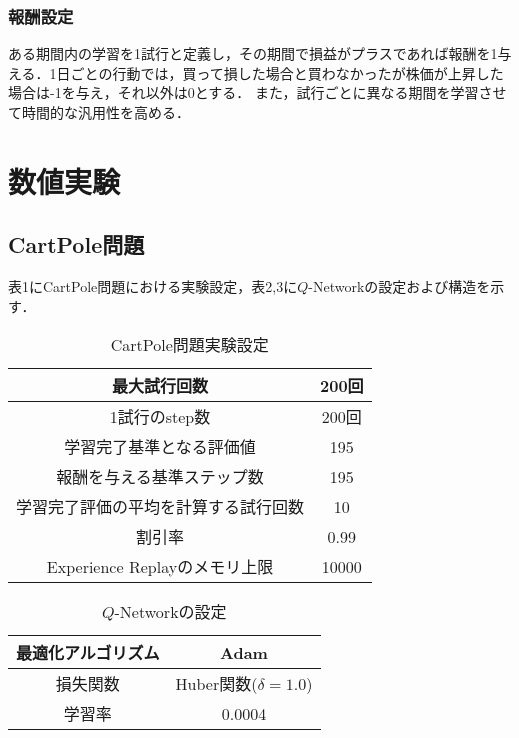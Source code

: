 \documentclass[twocolumn]{jarticle}
\begin{document}
        \subsubsection{報酬設定}
        ある期間内の学習を1試行と定義し，その期間で損益がプラスであれば報酬を1与える．1日ごとの行動では，買って損した場合と買わなかったが株価が上昇した場合は-1を与え，それ以外は0とする． また，試行ごとに異なる期間を学習させて時間的な汎用性を高める．

\section{数値実験}
        \subsection{CartPole問題}
        表1にCartPole問題における実験設定，表2,3に$Q$-Networkの設定および構造を示す．

        \begin{table}
            \caption{CartPole問題実験設定}
            \begin{tabular}{|c|c|} \hline
                最大試行回数 & 200回 \\ \hline
                1試行のstep数 & 200回 \\ \hline
                学習完了基準となる評価値 & 195 \\ \hline
                報酬を与える基準ステップ数 & 195 \\ \hline
                学習完了評価の平均を計算する試行回数 & 10 \\ \hline
                割引率 & 0.99 \\ \hline
                Experience Replayのメモリ上限 & 10000 \\ \hline
            \end{tabular}
        \end{table}

        \begin{table}
            \centering
            \caption{$Q$-Networkの設定}
            \begin{tabular}{|c|c|} \hline
                最適化アルゴリズム & Adam \\ \hline
                損失関数 & Huber関数($\delta=1.0$)\\ \hline %
                学習率 & 0.0004 \\ \hline
            \end{tabular}
        \end{table}
\end{document}
